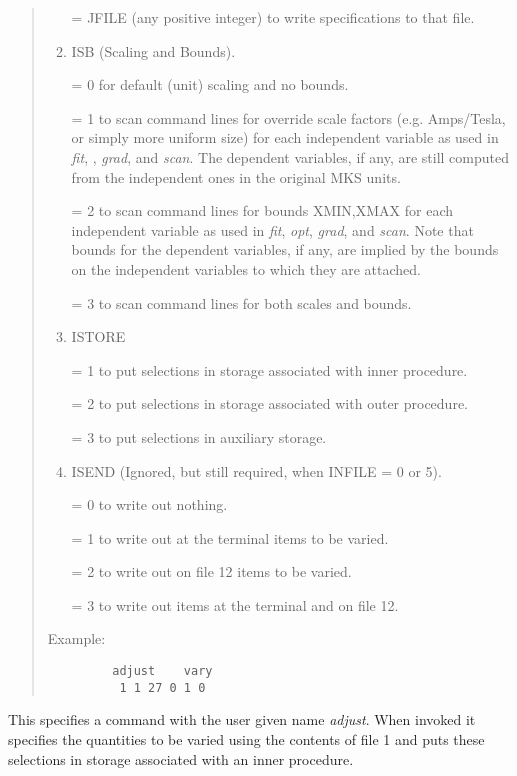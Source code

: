 \begin{quotation}
\begin{enumerate}
              = JFILE (any positive integer) to write specifications to
               that file.

       \item  ISB (Scaling and Bounds).

              = 0 for default (unit) scaling and no bounds.

              = 1 to scan command lines for override scale factors (e.g. Amps/Tesla,
              or \hspace*{1em}simply more uniform size) for each independent variable as used
              in {\em fit}, \hspace*{1em}{\em opt}, {\em grad}, and
			  {\em scan}.  The dependent variables, if any, are
              still computed \hspace*{1em}from the independent ones in the original MKS units.

              = 2 to scan command lines for bounds XMIN,XMAX for each independent
              \hspace*{1em}variable as used in {\em fit}, {\em opt}, {\em grad}, and
			  {\em scan}.  Note that bounds
              for the \hspace*{1em}dependent variables, if any, are implied by the bounds on
              the independent \hspace*{1em}variables to which they are attached.

              = 3 to scan command lines for both scales and bounds.

      \item   ISTORE

              = 1 to put selections in storage associated with inner
              procedure.

              = 2 to put selections in storage associated with outer
              procedure.

              = 3 to put selections in auxiliary storage.

       \item  ISEND (Ignored, but still required, when INFILE = 0 or 5).

              = 0 to write out nothing.

              = 1 to write out at the terminal items to be varied.

              = 2 to write out on file 12 items to be varied.

              = 3 to write out items at the terminal and on file 12.
\end{enumerate}

\vspace{5mm}
\noindent Example:
\begin{verbatim}
         adjust    vary
          1 1 27 0 1 0
\end{verbatim}
\end{quotation}
This specifies a command with the user given name {\em adjust}.  When invoked it specifies the quantities to be varied using the contents of file 1 and puts these selections in storage associated with an inner procedure.

